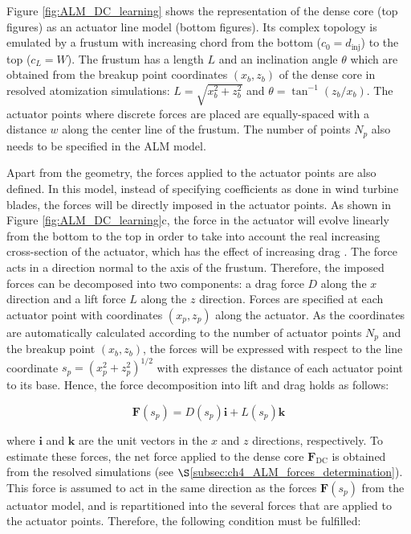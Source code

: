 Figure \ref{fig:ALM_DC_learning} shows the representation of the dense core (top figures) as an actuator line model (bottom figures). Its complex topology is emulated by a frustum with increasing chord from the bottom ($c_0 = d_\mathrm{inj}$) to the top ($c_L = W$). The frustum has a length $L$ and an inclination angle $\theta$ which are obtained from the breakup point coordinates $(x_b, z_b)$ of the dense core in resolved atomization simulations: $L = \sqrt{x_b^2 + z_b^2}$ and $\theta = \tan^{-1} \left( z_b / x_b\right)$. The actuator points where discrete forces are placed are equally-spaced with a distance $w$ along the center line of the frustum. The number of points $N_p$ also needs to be specified in the ALM model.

Apart from the geometry, the forces applied to the actuator points are also defined. In this model, instead of specifying coefficients as done in wind turbine blades, the forces will be directly imposed in the actuator points. As shown in Figure \ref{fig:ALM_DC_learning}c, the force in the actuator will evolve linearly from the bottom to the top in order to take into account the real increasing cross-section of the actuator, which has the effect of increasing drag . The force acts in a direction normal to the axis of the frustum. Therefore, the imposed forces can be decomposed into two components: a drag force $D$ along the $x$ direction and a lift force $L$ along the $z$ direction. Forces are specified at each actuator point with coordinates $\left( x_p, z_p \right)$ along the actuator. As the coordinates are automatically calculated according to the number of actuator points $N_p$ and the breakup point $\left( x_b, z_b \right)$, the forces will be expressed with respect to the line coordinate $s_p = \left( x_p^2 + z_p^2 \right)^{1/2}$ with expresses the distance of each actuator point to its base. Hence, the force decomposition into lift and drag holds as follows:

\begin{equation}
\textbf{F} \left( s_p \right) = D \left( s_p \right) \textbf{i} + L \left( s_p \right) \textbf{k} 
\end{equation}

where $\textbf{i}$ and $\textbf{k}$ are the unit vectors in the $x$ and $z$ directions, respectively. To estimate these forces, the net force applied to the dense core $\textbf{F}_\mathrm{DC}$ is obtained from the resolved simulations (see $\S$\ref{subsec:ch4_ALM_forces_determination}). This force is assumed to act in the same direction as the forces $\textbf{F} \left( s_p \right)$ from the actuator model, and is repartitioned into the several forces that are applied to the actuator points. Therefore, the following condition must be fulfilled:

